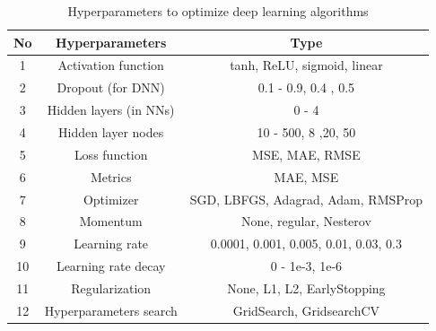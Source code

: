 \documentclass[12pt,a4paper]{report}
\begin{document}
\begin{table}[H]
\caption{Hyperparameters to optimize  deep learning algorithms}
\centering
\begin{adjustbox}{width=1\textwidth}
\small
\begin{tabular}{|c|c|c|}
\hline
\textbf{No} & \textbf{Hyperparameters} & \textbf{Type}                         \\ \hline
1           & Activation function     & tanh, ReLU, sigmoid, linear           \\ \hline
2           & Dropout (for DNN)       & 0.1 - 0.9, 0.4 , 0.5                  \\ \hline
3           & Hidden layers (in NNs)  & 0 - 4                                 \\ \hline
4           & Hidden layer nodes      & 10 - 500, 8 ,20, 50                   \\ \hline
5           & Loss function           & MSE, MAE, RMSE                        \\ \hline
6           & Metrics                 & MAE, MSE                              \\ \hline
7           & Optimizer               & SGD, LBFGS, Adagrad, Adam, RMSProp    \\ \hline
8           & Momentum                & None, regular, Nesterov               \\ \hline
9           & Learning rate           & 0.0001, 0.001, 0.005, 0.01, 0.03, 0.3 \\ \hline
10          & Learning rate decay     & 0 - 1e-3, 1e-6                        \\ \hline
11          & Regularization          & None, L1, L2, EarlyStopping           \\ \hline
12          & Hyperparameters search   & GridSearch, GridsearchCV              \\ \hline
\end{tabular}
\end{adjustbox}
\end{table}
\end{document}
